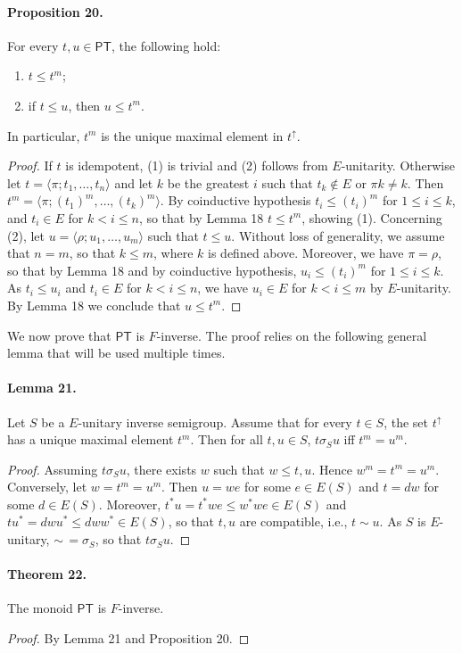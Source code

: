 \paragraph{Proposition 20.} For every $t,u\in\mathsf{PT}$, the following hold:
\begin{enumerate}\item $t\le t^m$;\item if $t\le u$, then $u\le t^m$.\end{enumerate}
In particular, $t^m$ is the unique maximal element in $t^{\uparrow}$.
\begin{proof}
If $t$ is idempotent, (1) is trivial and (2) follows from $E$-unitarity.
Otherwise let $t=\langle\pi;t_1,\ldots,t_n\rangle$ and let $k$ be the greatest $i$ such that $t_k\notin E$ or $\pi k\ne k$.
Then $t^m=\langle\pi;(t_1)^m,\ldots,(t_k)^m\rangle$.
By coinductive hypothesis $t_i\le(t_i)^m$ for $1\le i\le k$, and $t_i\in E$ for $k<i\le n$, so that by Lemma 18 $t\le t^m$, showing (1).
Concerning (2), let $u=\langle\rho;u_1,\ldots,u_m\rangle$ such that $t\le u$.
Without loss of generality, we assume that $n=m$, so that $k\le m$, where $k$ is defined above.
Moreover, we have $\pi=\rho$, so that by Lemma 18 and by coinductive hypothesis, $u_i\le(t_i)^m$ for $1\le i\le k$.
As $t_i\le u_i$ and $t_i\in E$ for $k<i\le n$, we have $u_i\in E$ for $k<i\le m$ by $E$-unitarity.
By Lemma 18 we conclude that $u\le t^m$.
\end{proof}
We now prove that $\mathsf{PT}$ is $F$-inverse. The proof relies on the following general lemma that will be used multiple times.
\paragraph{Lemma 21.} Let $S$ be a $E$-unitary inverse semigroup. Assume that for every $t\in S$, the set $t^{\uparrow}$ has a unique maximal element $t^m$.
Then for all $t,u\in S$, $t\mathrel{\sigma_S}u$ iff $t^m=u^m$.
\begin{proof}
Assuming $t\mathrel{\sigma_S}u$, there exists $w$ such that $w\le t,u$. Hence $w^m=t^m=u^m$.
Conversely, let $w=t^m=u^m$. Then $u=we$ for some $e\in E(S)$ and $t=dw$ for some $d\in E(S)$.
Moreover, $t^*u=t^*we\le w^*we\in E(S)$ and $tu^*=dwu^*\le dww^*\in E(S)$, so that $t,u$ are compatible, i.e., $t\sim u$.
As $S$ is $E$-unitary, $\sim\,=\sigma_S$, so that $t\mathrel{\sigma_S}u$.
\end{proof}

\paragraph{Theorem 22.} The monoid $\mathsf{PT}$ is $F$-inverse.

\begin{proof}
By Lemma 21 and Proposition 20.
\end{proof}

